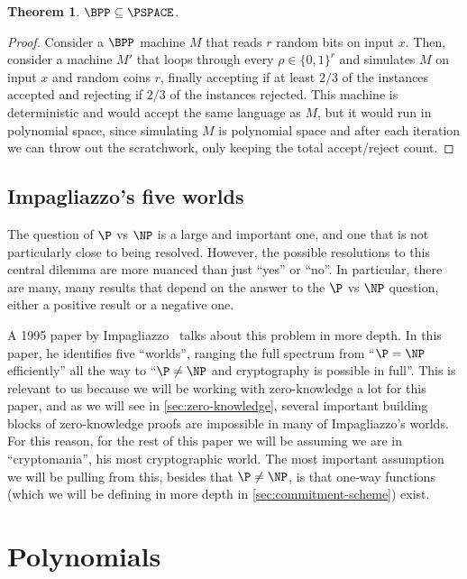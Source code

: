 \documentclass[english,12pt]{reedthesis}
\theoremstyle{plain}
\newtheorem{thm}{Theorem}[section]
\theoremstyle{definition}
\theoremstyle{remark}
\begin{document}
\begin{thm}\label{thm:bpp-subset-pspace}
  $\BPP \subseteq \PSPACE$.
\end{thm}

\begin{proof}
  Consider a $\BPP$ machine $M$ that reads $r$ random bits on input $x$. Then,
  consider a machine $M'$ that loops through every $\rho \in \{0, 1\}^{r}$ and
  simulates $M$ on input $x$ and random coins $r$, finally accepting if at least
  $2/3$ of the instances accepted and rejecting if $2/3$ of the instances
  rejected. This machine is deterministic and would accept the same language as
  $M$, but it would run in polynomial space, since simulating $M$ is polynomial
  space and after each iteration we can throw out the scratchwork, only keeping
  the total accept/reject count.
\end{proof}

\subsection{Impagliazzo's five worlds}\label{sec:five-worlds}

The question of $\P$ vs $\NP$ is a large and important one, and one that is not
particularly close to being resolved. However, the possible resolutions to this
central dilemma are more nuanced than just ``yes'' or ``no''. In particular,
there are many, many results that depend on the answer to the $\P$ vs $\NP$
question, either a positive result or a negative one.

A 1995 paper by Impagliazzo~\cite{Imp95} talks about this problem in more depth.
In this paper, he identifies five ``worlds'', ranging the full spectrum from
``$\P = \NP$ efficiently'' all the way to ``$\P \ne \NP$ and cryptography is
possible in full''. This is relevant to us because we will be working with
zero-knowledge a lot for this paper, and as we will see in
\cref{sec:zero-knowledge}, several important building blocks of zero-knowledge
proofs are impossible in many of Impagliazzo's worlds. For this reason, for the
rest of this paper we will be assuming we are in ``cryptomania'', his most
cryptographic world. The most important assumption we will be pulling from this,
besides that $\P \ne \NP$, is that one-way functions (which we will be defining in
more depth in \cref{sec:commitment-scheme}) exist.

\section{Polynomials}\label{sec:polynomial}
\end{document}
